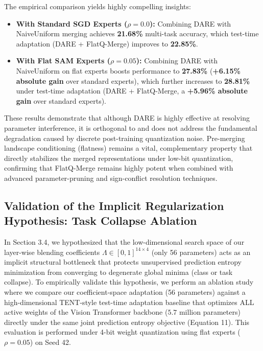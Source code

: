 The empirical comparison yields highly compelling insights:
\begin{itemize}
    \item \textbf{With Standard SGD Experts ($\rho=0.0$):} Combining DARE with NaiveUniform merging achieves \textbf{21.68\%} multi-task accuracy, which test-time adaptation (DARE + FlatQ-Merge) improves to \textbf{22.85\%}.
    \item \textbf{With Flat SAM Experts ($\rho=0.05$):} Combining DARE with NaiveUniform on flat experts boosts performance to \textbf{27.83\%} (\textbf{+6.15\% absolute gain} over standard experts), which further increases to \textbf{28.81\%} under test-time adaptation (DARE + FlatQ-Merge, a \textbf{+5.96\% absolute gain} over standard experts).
\end{itemize}
These results demonstrate that although DARE is highly effective at resolving parameter interference, it is orthogonal to and does not address the fundamental degradation caused by discrete post-training quantization noise. Pre-merging landscape conditioning (flatness) remains a vital, complementary property that directly stabilizes the merged representations under low-bit quantization, confirming that FlatQ-Merge remains highly potent when combined with advanced parameter-pruning and sign-conflict resolution techniques.

\subsection{Validation of the Implicit Regularization Hypothesis: Task Collapse Ablation}
\label{sec:exp_collapse}
In Section 3.4, we hypothesized that the low-dimensional search space of our layer-wise blending coefficients $\Lambda \in [0, 1]^{14 \times 4}$ (only 56 parameters) acts as an implicit structural bottleneck that protects unsupervised prediction entropy minimization from converging to degenerate global minima (class or task collapse). To empirically validate this hypothesis, we perform an ablation study where we compare our coefficient-space adaptation (56 parameters) against a high-dimensional TENT-style test-time adaptation baseline that optimizes ALL active weights of the Vision Transformer backbone ($5.7$ million parameters) directly under the same joint prediction entropy objective (Equation 11). This evaluation is performed under 4-bit weight quantization using flat experts ($\rho=0.05$) on Seed 42.

